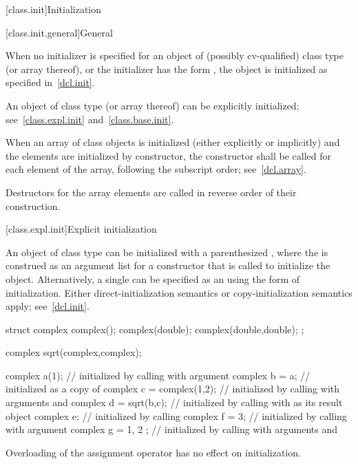 [class.init]{Initialization}%

[class.init.general]{General}%
%
%

\pnum
When no initializer is specified for an object of (possibly
cv-qualified) class type (or array thereof), or the initializer has
the form
\tcode{()},
the object is initialized as specified in~\ref{dcl.init}.

\pnum
An object of class type (or array thereof) can be explicitly initialized;
see~\ref{class.expl.init} and~\ref{class.base.init}.

\pnum
{}%
When an array of class objects is initialized
(either explicitly or implicitly) and the elements are initialized by constructor,
the constructor shall be called for each element of the array,
following the subscript order; see~\ref{dcl.array}.
\begin{note}
Destructors for the array elements are called in reverse order of their
construction.
\end{note}

[class.expl.init]{Explicit initialization}%
%
%

\pnum
An object of class type can be initialized with a parenthesized
,
where the
is construed as an argument list for a constructor
that is called to initialize the object.
Alternatively, a single
can be specified as an
using the
\tcode{=}
form of initialization.
Either direct-initialization semantics or copy-initialization semantics apply;
see~\ref{dcl.init}.
\begin{example}
\begin{codeblock}
struct complex {
  complex();
  complex(double);
  complex(double,double);
};

complex sqrt(complex,complex);

complex a(1);                   // initialized by calling  with argument 
complex b = a;                  // initialized as a copy of 
complex c = complex(1,2);       // initialized by calling  with arguments  and 
complex d = sqrt(b,c);          // initialized by calling  with  as its result object
complex e;                      // initialized by calling 
complex f = 3;                  // initialized by calling  with argument 
complex g = { 1, 2 };           // initialized by calling  with arguments  and 
\end{codeblock}
\end{example}
\begin{note}
%
Overloading of the assignment operator
has no effect on initialization.
\end{note}

